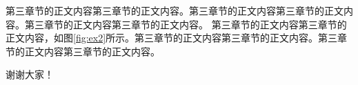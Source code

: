 \documentclass{yacaugrad}
\begin{document}

第三章节的正文内容第三章节的正文内容。第三章节的正文内容第三章节的正文内容。第三章节的正文内容第三章节的正文内容。
第三章节的正文内容第三章节的正文内容，如图\ref{fig:ex2}所示。第三章节的正文内容第三章节的正文内容。第三章节的正文内容第三章节的正文内容。

\renewcommand{\sectionmark}[1]{\markboth{#1}{}}
\makebib

\begin{thank}
  谢谢大家！
\end{thank}


\end{document}
